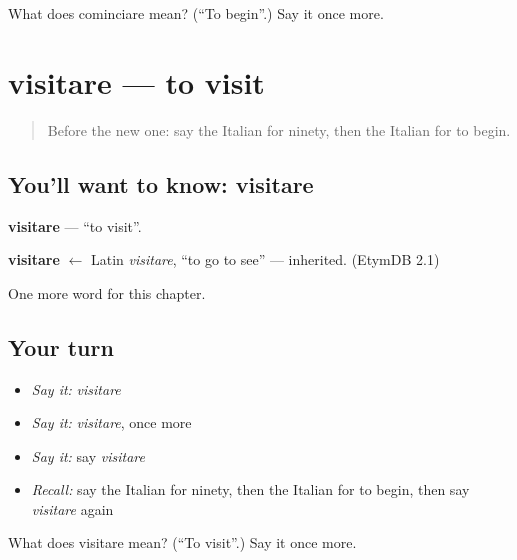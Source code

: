 \begin{tcolorbox}[breakable,colback=teal!4,colframe=teal!35!black,title={Before you move on}]
What does cominciare mean? (\textquotedblleft{}To begin\textquotedblright{}.) Say it once more.
\end{tcolorbox}
\section[visitare]{visitare — to visit}

\label{lesson:IT-C133-visitare}



\begin{quote}
Before the new one: say the Italian for ninety, then the Italian for to begin.
\end{quote}

\subsection*{You'll want to know: visitare}
\textbf{visitare} — \textquotedblleft{}to visit\textquotedblright{}.

\begin{cousinweb}
\textbf{visitare} $\leftarrow$ Latin \emph{visitare}, \textquotedblleft{}to go to see\textquotedblright{} — inherited. (EtymDB 2.1)
\end{cousinweb}

\begin{grammarlens}[title={What you've built}]
One more word for this chapter.
\end{grammarlens}

\subsection*{Your turn}
\begin{itemize}
\raggedright
  \item \emph{Say it:} \emph{visitare}
  \item \emph{Say it:} \emph{visitare}, once more
  \item \emph{Say it:} say \emph{visitare}
  \item \emph{Recall:} say the Italian for ninety, then the Italian for to begin, then say \emph{visitare} again
\end{itemize}

\begin{tcolorbox}[breakable,colback=teal!4,colframe=teal!35!black,title={Before you move on}]
What does visitare mean? (\textquotedblleft{}To visit\textquotedblright{}.) Say it once more.
\end{tcolorbox}

